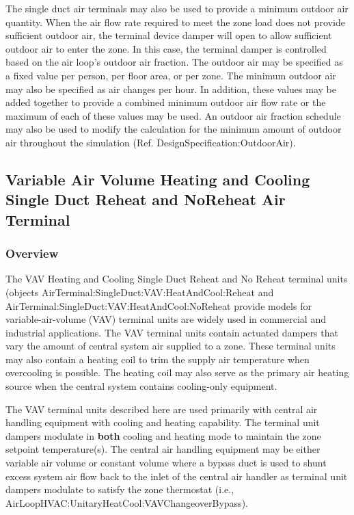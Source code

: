 The single duct air terminals may also be used to provide a minimum outdoor air quantity. When the air flow rate required to meet the zone load does not provide sufficient outdoor air, the terminal device damper will open to allow sufficient outdoor air to enter the zone. In this case, the terminal damper is controlled based on the air loop's outdoor air fraction. The outdoor air may be specified as a fixed value per person, per floor area, or per zone. The minimum outdoor air may also be specified as air changes per hour. In addition, these values may be added together to provide a combined minimum outdoor air flow rate or the maximum of each of these values may be used. An outdoor air fraction schedule may also be used to modify the calculation for the minimum amount of outdoor air throughout the simulation (Ref. DesignSpecification:OutdoorAir).

\subsection{Variable Air Volume Heating and Cooling Single Duct Reheat and NoReheat Air Terminal}\label{variable-air-volume-heating-and-cooling-single-duct-reheat-and-noreheat-air-terminal}

\subsubsection{Overview}\label{overview-001}

The VAV Heating and Cooling Single Duct Reheat and No Reheat terminal units (objects AirTerminal:SingleDuct:VAV:HeatAndCool:Reheat and \\ AirTerminal:SingleDuct:VAV:HeatAndCool:NoReheat provide models for variable-air-volume (VAV) terminal units are widely used in commercial and industrial applications. The VAV terminal units contain actuated dampers that vary the amount of central system air supplied to a zone. These terminal units may also contain a heating coil to trim the supply air temperature when overcooling is possible. The heating coil may also serve as the primary air heating source when the central system contains cooling-only equipment.

The VAV terminal units described here are used primarily with central air handling equipment with cooling and heating capability. The terminal unit dampers modulate in \textbf{both} cooling and heating mode to maintain the zone setpoint temperature(s). The central air handling equipment may be either variable air volume or constant volume where a bypass duct is used to shunt excess system air flow back to the inlet of the central air handler as terminal unit dampers modulate to satisfy the zone thermostat (i.e., AirLoopHVAC:UnitaryHeatCool:VAVChangeoverBypass).


